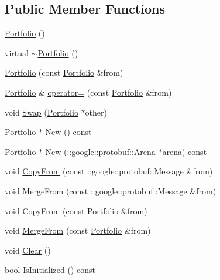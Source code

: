 \subsection*{Public Member Functions}
\begin{DoxyCompactItemize}
\item 
\hyperlink{classinvest_1_1_portfolio_a6ff4b5128705faaa11a3bf3a236215b3}{Portfolio} ()
\item 
virtual \hyperlink{classinvest_1_1_portfolio_ac7b450d6dd22ad631e76516105daf380}{$\sim$\+Portfolio} ()
\item 
\hyperlink{classinvest_1_1_portfolio_a38c0fbc8ebab336823d61ef8e2456c5c}{Portfolio} (const \hyperlink{classinvest_1_1_portfolio}{Portfolio} \&from)
\item 
\hyperlink{classinvest_1_1_portfolio}{Portfolio} \& \hyperlink{classinvest_1_1_portfolio_a2c8f982d1415bb1d10ef6142fdde6fff}{operator=} (const \hyperlink{classinvest_1_1_portfolio}{Portfolio} \&from)
\item 
void \hyperlink{classinvest_1_1_portfolio_a0b3a4172fafe008b3dc61660c9e38771}{Swap} (\hyperlink{classinvest_1_1_portfolio}{Portfolio} $\ast$other)
\item 
\hyperlink{classinvest_1_1_portfolio}{Portfolio} $\ast$ \hyperlink{classinvest_1_1_portfolio_a3dceedee96bb25ecbd0c27f8222303b5}{New} () const 
\item 
\hyperlink{classinvest_1_1_portfolio}{Portfolio} $\ast$ \hyperlink{classinvest_1_1_portfolio_accad924b455beffc06ac832336af14ab}{New} (\+::google\+::protobuf\+::\+Arena $\ast$arena) const 
\item 
void \hyperlink{classinvest_1_1_portfolio_a78384e7ea96b1e7ea98410ab2142e874}{Copy\+From} (const \+::google\+::protobuf\+::\+Message \&from)
\item 
void \hyperlink{classinvest_1_1_portfolio_ab2da7d45e65ae545981fe34ac7e697a9}{Merge\+From} (const \+::google\+::protobuf\+::\+Message \&from)
\item 
void \hyperlink{classinvest_1_1_portfolio_a67eb937f611dcca7506e51b6dbebbcb3}{Copy\+From} (const \hyperlink{classinvest_1_1_portfolio}{Portfolio} \&from)
\item 
void \hyperlink{classinvest_1_1_portfolio_a4412811d3de1266d796422811c170227}{Merge\+From} (const \hyperlink{classinvest_1_1_portfolio}{Portfolio} \&from)
\item 
void \hyperlink{classinvest_1_1_portfolio_afb1dc52f01faf6e0e922882294b94eea}{Clear} ()
\item 
bool \hyperlink{classinvest_1_1_portfolio_a7cbaea62fd1c853523fcdfb7849217f1}{Is\+Initialized} () const 

\end{DoxyCompactItemize}
